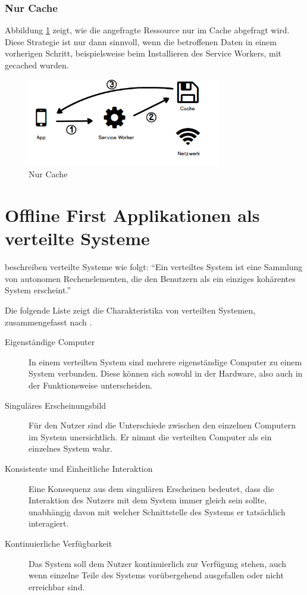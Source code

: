 \documentclass[a4paper, 12pt]{scrreprt}
\begin{document}
\subsubsection{Nur Cache}
Abbildung \ref{fig:cachingCacheOnly} zeigt, wie die angefragte Ressource nur im Cache abgefragt wird. Diese Strategie ist nur dann sinnvoll, wenn die betroffenen Daten in einem vorherigen Schritt, beispielsweise beim Installieren des Service Workers, mit gecached wurden.

\begin{figure}[h]
	\centering
	\includegraphics[width=0.75\textwidth]{cacheonly.png}
	\caption{Nur Cache}
	\label{fig:cachingCacheOnly}
\end{figure}

\section{Offline First Applikationen als verteilte Systeme}\label{sec:OfflineFirstVerteiteSysteme}
\citet{ArticleDistributedSystems} beschreiben verteilte Systeme wie folgt: \enquote{Ein verteiltes System ist eine Sammlung von autonomen Rechenelementen, die den Benutzern als ein einziges kohärentes System erscheint.}

Die folgende Liste zeigt die Charakteristika von verteilten Systemen, zusammengefasst nach \citet{BookDistributedSystemsDefinition}.

\begin{description}
\item[Eigenständige Computer] In einem verteilten System sind mehrere eigenständige Computer zu einem System verbunden. Diese können sich sowohl in der Hardware, also auch in der Funktionsweise unterscheiden. 
\item[Singuläres Erscheinungsbild] Für den Nutzer sind die Unterschiede zwischen den einzelnen Computern im System unersichtlich. Er nimmt die verteilten Computer als ein einzelnes System wahr. 
\item[Konsistente und Einheitliche Interaktion]
	Eine Konsequenz aus dem singulären Erscheinen bedeutet, dass die Interaktion des Nutzers mit dem System immer gleich sein sollte, unabhängig davon mit welcher Schnittstelle des Systems er tatsächlich interagiert. 
\item[Kontinuierliche Verfügbarkeit]
	Das System soll dem Nutzer kontinuierlich zur Verfügung stehen, auch wenn einzelne Teile des Systems vorübergehend ausgefallen oder nicht erreichbar sind.
\end{description}
\label{tab:charakteristikaDistributedSystem}
\end{document}
